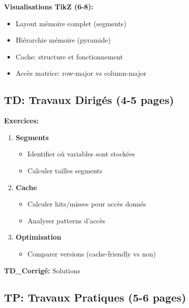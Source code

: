 \documentclass[10pt,a4paper]{article}
\begin{document}
\textbf{Visualisations TikZ (6-8):}
\begin{itemize}
\item Layout mémoire complet (segments)
\item Hiérarchie mémoire (pyramide)
\item Cache: structure et fonctionnement
\item Accès matrice: row-major vs column-major
\end{itemize}

\subsection*{TD: Travaux Dirigés (4-5 pages)}

\textbf{Exercices:}
\begin{enumerate}
\item \textbf{Segments}
   \begin{itemize}
   \item Identifier où variables sont stockées
   \item Calculer tailles segments
   \end{itemize}

\item \textbf{Cache}
   \begin{itemize}
   \item Calculer hits/misses pour accès donnés
   \item Analyser patterns d'accès
   \end{itemize}

\item \textbf{Optimisation}
   \begin{itemize}
   \item Comparer versions (cache-friendly vs non)
   \end{itemize}
\end{enumerate}

\textbf{TD\_Corrigé:} Solutions

\subsection*{TP: Travaux Pratiques (5-6 pages)}
\end{document}
